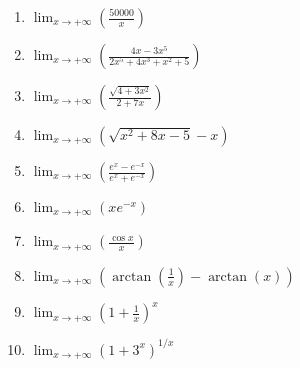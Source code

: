 \documentclass[12pt]{article}
\newif\ifans
\begin{document}
\begin{enumerate}

\item $\lim_{x \to +\infty}\left({\frac{50000}{x}}\right)$

\ifans{\fbox{$0$}} \fi

\item $\lim_{x \to +\infty}\left({\frac{4x-3x^5}{2x^5+4x^3+x^2+5}}\right)$

\ifans{\fbox{$-\frac{3}{2}$}} \fi

\item $\lim_{x \to +\infty}\left({\frac{\sqrt{4+3x^2}}{2+7x}}\right)$

\ifans{\fbox{$\frac{\sqrt{3}}{7}$}} \fi

\item $\lim_{x \to +\infty}\left({\sqrt{x^2+8x-5}-x}\right)$

\ifans{\fbox{$4$}} \fi

\item $\lim_{x \to +\infty}\left({\frac{e^x-e^{-x}}{e^x+e^{-x}}}\right)$

\ifans{\fbox{$1$}} \fi

\item $\lim_{x \to +\infty}\left({xe^{-x}}\right)$

\ifans{\fbox{$0$}} \fi

\item $\lim_{x \to +\infty}\left({\frac{\cos{x}}{x}}\right)$

\ifans{\fbox{$0$}} \fi

\item $\lim_{x \to +\infty}\left({\arctan\left(\frac{1}{x}\right)-\arctan(x)}\right)$

\ifans{\fbox{$-\frac{\pi}{2}$}} \fi

\item $\lim_{x \to +\infty}\left(1+\frac{1}{x}\right)^{x}$

\ifans{\fbox{$e$}} \fi

\item $\lim_{x \to +\infty}\left(1+3^x\right)^{1/x}$

\ifans{\fbox{$3$}} \fi

\end{enumerate}

\end{document}
